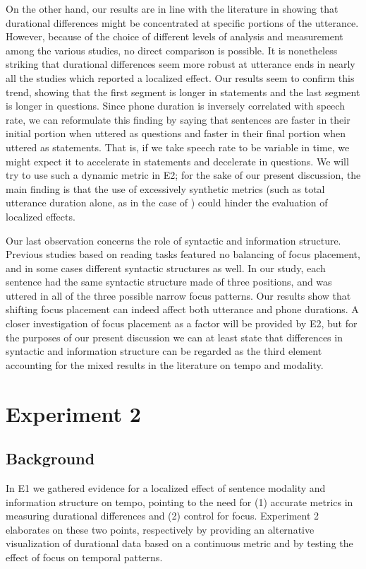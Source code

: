 On the other hand, our results are in line with the literature in showing that durational differences might be concentrated at specific portions of the utterance. However, because of the choice of different levels of analysis and measurement among the various studies, no direct comparison is possible. It is nonetheless striking that durational differences seem more robust at utterance ends in nearly all the studies which reported a localized effect. Our results seem to confirm this trend, showing that the first segment is longer in statements and the last segment is longer in questions. Since phone duration is inversely correlated with speech rate, we can reformulate this finding by saying that sentences are faster in their initial portion when uttered as questions and faster in their final portion when uttered as statements. That is, if we take speech rate to be variable in time, we might expect it to accelerate in statements and decelerate in questions. We will try to use such a dynamic metric in E2; for the sake of our present discussion, the main finding is that the use of excessively synthetic metrics (such as total utterance duration alone, as in the case of \citealt{maturi1988intonazione}) could hinder the evaluation of localized effects.

Our last observation concerns the role of syntactic and information structure. Previous studies based on reading tasks featured no balancing of focus placement, and in some cases different syntactic structures as well. In our study, each sentence had the same syntactic structure made of three positions, and was uttered in all of the three possible narrow focus patterns. Our results show that shifting focus placement can indeed affect both utterance and phone durations. A closer investigation of focus placement as a factor will be provided by E2, but for the purposes of our present discussion we can at least state that differences in syntactic and information structure can be regarded as the third element accounting for the mixed results in the literature on tempo and modality.

\section{Experiment 2}\label{sec44}
\subsection{Background}\label{sec440}
In E1 we gathered evidence for a localized effect of sentence modality and information structure on tempo, pointing to the need for (1) accurate metrics in measuring durational differences and (2) control for focus. Experiment 2 elaborates on these two points, respectively by providing an alternative visualization of durational data based on a continuous metric and by testing the effect of focus on temporal patterns.

